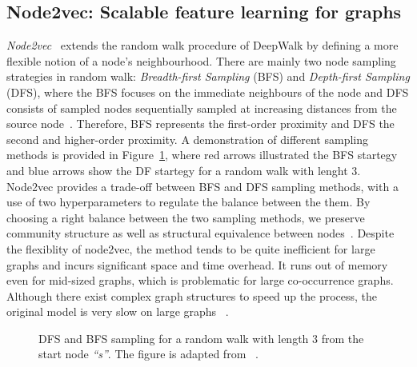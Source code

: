 \subsection{Node2vec: Scalable feature learning for graphs }
\label{subsec:node2vec}
\emph{Node2vec}~ extends the random walk procedure of DeepWalk by defining a more flexible notion of a node’s neighbourhood. There are mainly two node sampling strategies in random walk: \emph{Breadth-first Sampling} (BFS) and \emph{Depth-first Sampling} (DFS), where the BFS focuses on the immediate neighbours of the node and DFS consists of sampled nodes sequentially sampled at increasing distances from the source node~.
Therefore, BFS represents the first-order proximity and DFS the second and higher-order proximity. A demonstration of different sampling methods is provided in Figure~\ref{fig:dfs_bfs}, where red arrows illustrated the BFS startegy and blue arrows show the DF startegy for a random walk with lenght $3$. Node2vec provides a trade-off between BFS and DFS sampling methods, with a use of two hyperparameters to regulate the balance between the them. By choosing a right balance between the two sampling methods, we preserve community structure as well as structural equivalence between nodes~.
Despite the flexiblity of node2vec, the method tends to be quite inefficient for large graphs and incurs significant space and time overhead. It runs out of memory even for mid-sized graphs, which is problematic for large co-occurrence graphs. Although there exist complex graph structures to speed up the process, the original model is very slow on large graphs ~. 
\begin{figure}
\centering 
\resizebox{0.45\textwidth}{0.25\textwidth}{      

}
\caption{DFS and BFS sampling for a random walk with length $3$ from the start node \emph{``s''}. The figure is adapted from ~.}
\label{fig:dfs_bfs}
\end{figure}
